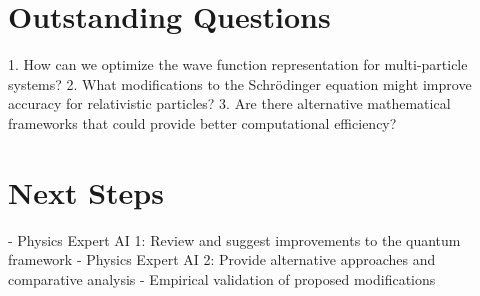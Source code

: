 \documentclass{article}
\begin{document}
\section{Outstanding Questions}
1. How can we optimize the wave function representation for multi-particle systems?
2. What modifications to the Schrödinger equation might improve accuracy for relativistic particles?
3. Are there alternative mathematical frameworks that could provide better computational efficiency?

\section{Next Steps}
- Physics Expert AI 1: Review and suggest improvements to the quantum framework
- Physics Expert AI 2: Provide alternative approaches and comparative analysis
- Empirical validation of proposed modifications
\end{document}
